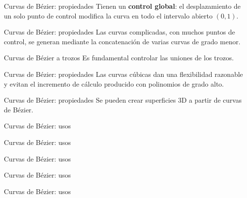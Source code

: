 \documentclass[main.tex]{subfiles}
\begin{document}
\begin{frame}[t]{Curvas de Bézier: propiedades}
Tienen un \textbf{control global}: el desplazamiento de un solo punto de control modifica la curva en todo el intervalo abierto $(0,1)$.
\end{frame}

\begin{frame}[t]{Curvas de Bézier: propiedades}
Las curvas complicadas, con muchos puntos de control, se generan mediante la concatenación de varias curvas de grado menor.
\end{frame}

\begin{frame}[t]{Curvas de Bézier a trozos}
Es fundamental controlar las uniones de los trozos.
\end{frame}

\begin{frame}[t]{Curvas de Bézier: propiedades}
Las curvas cúbicas dan una flexibilidad razonable y evitan el incremento de cálculo producido con polinomios de grado alto.
\end{frame}

\begin{frame}[t]{Curvas de Bézier: propiedades}
Se pueden crear superficies 3D a partir de curvas de Bézier.
\end{frame}

\begin{frame}[t]{Curvas de Bézier: usos}
\end{frame}

\begin{frame}[t]{Curvas de Bézier: usos}
\end{frame}

\begin{frame}[t]{Curvas de Bézier: usos}
\end{frame}

\begin{frame}[t]{Curvas de Bézier: usos}
\end{frame}

\begin{frame}[t]{Curvas de Bézier: usos}
\end{frame}
\end{document}
